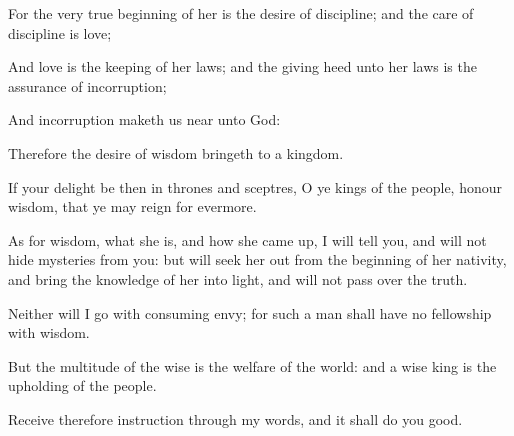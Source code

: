 {\par }{\PP {}For the very true beginning of her is the desire of discipline; and the care of discipline is love;
\par }{\PP {}And love is the keeping of her laws; and the giving heed unto her laws is the assurance of incorruption;
\par }{\PP {}And incorruption maketh us near unto God:
\par }{\PP {}Therefore the desire of wisdom bringeth to a kingdom.
\par }{\PP {}If your delight be then in thrones and sceptres, O ye kings of the people, honour wisdom, that ye may reign for evermore.
\par }{\PP {}As for wisdom, what she is, and how she came up, I will tell you, and will not hide mysteries from you: but will seek her out from the beginning of her nativity, and bring the knowledge of her into light, and will not pass over the truth.
\par }{\PP {}Neither will I go with consuming envy; for such a man shall have no fellowship with wisdom.
\par }{\PP {}But the multitude of the wise is the welfare of the world: and a wise king is the upholding of the people.
\par }{\PP {}Receive therefore instruction through my words, and it shall do you good.

}
